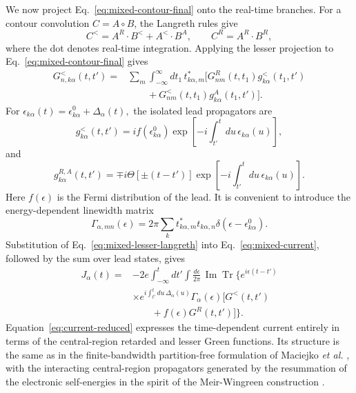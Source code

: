 \documentclass[
 reprint,
 superscriptaddress,
 amsmath,amssymb,
 aps,prb,
 longbibliography,
 floatfix
]{revtex4-2}
\begin{document}
We now project Eq.~\eqref{eq:mixed-contour-final} onto the real-time branches. For a contour convolution \(C=A\circ B\), the Langreth rules give
\begin{equation*}
C^< = A^R\!\cdot B^< + A^<\!\cdot B^A,
\qquad
C^R = A^R\!\cdot B^R,
\end{equation*}
where the dot denotes real-time integration. Applying the lesser projection to Eq.~\eqref{eq:mixed-contour-final} gives
\begin{equation}
\begin{aligned}
G_{n,k\alpha}^{<}(t,t')
={}&
\sum_m
\int_{-\infty}^{\infty}dt_1\,
t_{k\alpha,m}^{*}\Big[
G_{nm}^{R}(t,t_1)
g_{k\alpha}^{<}(t_1,t')
\\
&\qquad+
G_{nm}^{<}(t,t_1)
g_{k\alpha}^{A}(t_1,t')
\Big].
\end{aligned}
\label{eq:mixed-lesser-langreth}
\end{equation}
For $\epsilon_{k\alpha}(t) = \epsilon_{k\alpha}^{0} + \Delta_\alpha(t),$ the isolated lead propagators are
\begin{equation*}
g_{k\alpha}^{<}(t,t')
=
i f(\epsilon_{k\alpha}^{0})
\exp\!\left[
-i\int_{t'}^{t}du\,
\epsilon_{k\alpha}(u)
\right],
\end{equation*}
and
\begin{equation*}
g_{k\alpha}^{R,A}(t,t')
=
\mp i
\Theta[\pm(t-t')]
\exp\!\left[
-i\int_{t'}^{t}du\,
\epsilon_{k\alpha}(u)
\right].
\end{equation*}
Here \(f(\epsilon)\) is the Fermi distribution of the lead. It is convenient to introduce the energy-dependent linewidth matrix
\begin{equation*}
\Gamma_{\alpha,mn}(\epsilon)
=
2\pi
\sum_k
t_{k\alpha,m}^{*}
t_{k\alpha,n}
\delta(\epsilon-\epsilon_{k\alpha}^{0}).
\end{equation*}
Substitution of Eq.~\eqref{eq:mixed-lesser-langreth} into Eq.~\eqref{eq:mixed-current}, followed by the sum over lead states, gives
\begin{equation}
\boxed{
\begin{aligned}
J_\alpha(t)
={}&
-2e
\int_{-\infty}^{t}dt'
\int\frac{d\epsilon}{2\pi}\,
\operatorname{Im}
\operatorname{Tr}
\Bigg\{
e^{i\epsilon(t-t')}
\\
&\times
e^{i\int_{t'}^{t}du\,\Delta_\alpha(u)}
\Gamma_\alpha(\epsilon)
\Big[
G^<(t,t')\\
&\qquad+
f(\epsilon)G^R(t,t')
\Big]
\Bigg\}.
\label{eq:current-reduced}
\end{aligned}}
\end{equation}
Equation~\eqref{eq:current-reduced} expresses the time-dependent current entirely in terms of the central-region retarded and lesser Green functions. Its structure is the same as in the finite-bandwidth partition-free formulation of Maciejko \textit{et al.} \cite{MaciejkoWangGuo2006}, with the interacting central-region propagators generated by the resummation of the electronic self-energies in the spirit of the Meir-Wingreen construction
\cite{MeirWingreen1992}.
\end{document}
